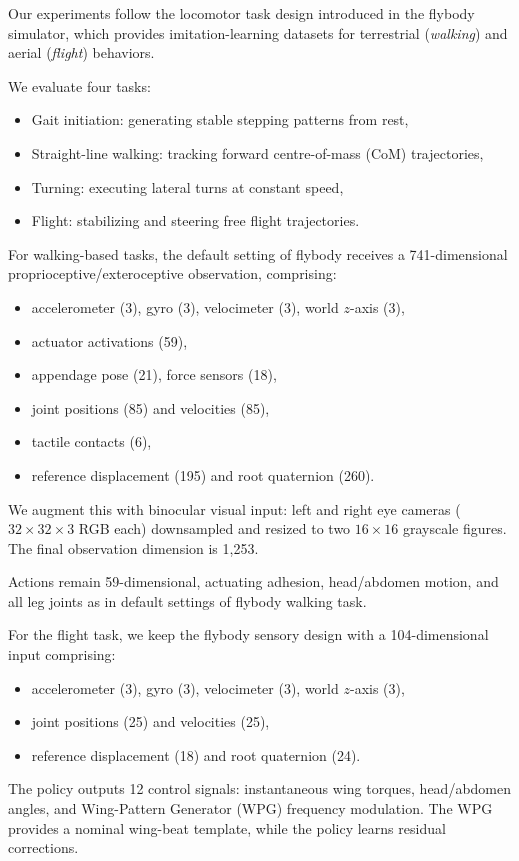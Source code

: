 \documentclass[a4paper]{easychair}
\begin{document}
Our experiments follow the locomotor task design introduced in the flybody simulator, which provides imitation-learning datasets for terrestrial (\emph{walking}) and aerial (\emph{flight}) behaviors.

We evaluate four tasks:
\begin{itemize}
\setlength{\itemsep}{0pt}
\setlength{\parsep}{0pt}
\setlength{\parskip}{0pt}
    \item Gait initiation: generating stable stepping patterns from rest,
    \item Straight-line walking: tracking forward centre-of-mass (CoM) trajectories,
    \item Turning: executing lateral turns at constant speed,
    \item Flight: stabilizing and steering free flight trajectories.
\end{itemize}
For walking-based tasks, the default setting of flybody receives a 741-dimensional proprioceptive/exteroceptive observation, comprising:
\begin{itemize}
\setlength{\itemsep}{0pt}
\setlength{\parsep}{0pt}
\setlength{\parskip}{0pt}
  \item accelerometer (3), gyro (3), velocimeter (3), world $z$-axis (3),
  \item actuator activations (59),
  \item appendage pose (21), force sensors (18),
  \item joint positions (85) and velocities (85),
  \item tactile contacts (6),
  \item reference displacement (195) and root quaternion (260).
\end{itemize}
We augment this with binocular visual input: left and right eye cameras ($32\times32\times3$ RGB each) downsampled and resized to two $16\times16$ grayscale figures. The final observation dimension is 1,253.

Actions remain 59-dimensional, actuating adhesion, head/abdomen motion, and all leg joints as in default settings of flybody walking task.

For the flight task, we keep the flybody sensory design with a 104-dimensional input comprising:
\begin{itemize}
\setlength{\itemsep}{0pt}
\setlength{\parsep}{0pt}
\setlength{\parskip}{0pt}
    \item accelerometer (3), gyro (3), velocimeter (3), world $z$-axis (3),
    \item joint positions (25) and velocities (25),
    \item reference displacement (18) and root quaternion (24).
\end{itemize}
The policy outputs 12 control signals: instantaneous wing torques, head/abdomen angles, and Wing-Pattern Generator (WPG) frequency modulation. The WPG provides a nominal wing-beat template, while the policy learns residual corrections.
\end{document}
